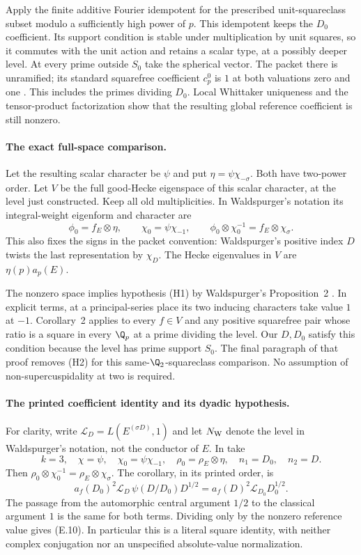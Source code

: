 Apply the finite additive Fourier idempotent for the prescribed
unit-squareclass subset modulo a sufficiently high power of $p$.
This idempotent keeps the $D_0$ coefficient. Its support condition
is stable under multiplication by unit squares, so it commutes
with the unit action and retains a scalar type, at a possibly
deeper level. At every prime outside $S_0$ take the spherical vector.
The packet there is unramified; its standard squarefree coefficient
$c_p^0$ is $1$ at both valuations zero and one
\cite[Section~I.3, pp.~377--378]{waldspurger}.
This includes the primes dividing $D_0$. Local Whittaker uniqueness
and the tensor-product factorization show that the resulting
global reference coefficient is still nonzero.

\paragraph{The exact full-space comparison.}
Let the resulting scalar character be $\psi$ and put
$\eta=\psi\chi_{-\sigma}$. Both have two-power order.
Let $V$ be the full good-Hecke eigenspace of this scalar character,
at the level just constructed. Keep all old multiplicities. In
Waldspurger's notation its integral-weight eigenform and character are
\[
 \phi_0=f_E\otimes\eta,\qquad
 \chi_0=\psi\chi_{-1},\qquad
 \phi_0\otimes\chi_0^{-1}=f_E\otimes\chi_\sigma .
\]
This also fixes the signs in the packet convention: Waldspurger's
positive index $D$ twists the last representation by $\chi_D$.
The Hecke eigenvalues in $V$ are $\eta(p)a_p(E)$.

The nonzero space implies hypothesis (H1) by Waldspurger's
Proposition~2 \cite[Section~I.2, p.~377]{waldspurger}. In explicit terms, at a principal-series
place its two inducing characters take value $1$ at $-1$.
Corollary~2 \cite[pp.~483--484]{waldspurger} applies to every $f\in V$ and any
positive squarefree pair whose ratio is a square in every
$\Q_p$ at a prime dividing the level. Our $D,D_0$ satisfy
this condition because the level has prime support $S_0$.
The final paragraph of that proof removes (H2) for this
same-$\Q_2$-squareclass comparison. No assumption of
non-supercuspidality at two is required.

\paragraph{The printed coefficient identity and its dyadic hypothesis.}
For clarity, write $\mathcal L_D=L(E^{(\sigma D)},1)$ and let
$N_{\rm W}$ denote the level in Waldspurger's notation, not the
conductor of $E$. In \cite[Corollary~2, pp.~483--484]{waldspurger}
take
\[
 k=3,\quad \chi=\psi,\quad \chi_0=\psi\chi_{-1},\quad
 \rho_0=\rho_E\otimes\eta,\quad n_1=D_0,\quad n_2=D.
\]
Then $\rho_0\otimes\chi_0^{-1}=\rho_E\otimes\chi_\sigma$.
The corollary, in its printed order, is
\[
 a_f(D_0)^2\mathcal L_D\,\psi(D/D_0)D^{1/2}
   =a_f(D)^2\mathcal L_{D_0}D_0^{1/2}.
\]
The passage from the automorphic central argument $1/2$ to the
classical argument $1$ is the same for both terms. Dividing only
by the nonzero reference value gives (E.10). In particular this
is a literal square identity, with neither complex conjugation
nor an unspecified absolute-value normalization.

